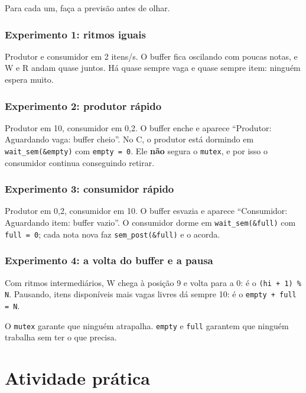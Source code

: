 \documentclass[11pt,a4paper]{article}
\newcommand{\cmd}[1]{\texttt{#1}}
\begin{document}
Para cada um, faça a previsão antes de olhar.

\subsubsection{Experimento 1: ritmos iguais}
Produtor e consumidor em 2 itens/s. O buffer fica oscilando com poucas notas, e W e R andam quase juntos. Há quase sempre vaga e quase sempre item: ninguém espera muito.

\subsubsection{Experimento 2: produtor rápido}
Produtor em 10, consumidor em 0,2. O buffer enche e aparece ``Produtor: Aguardando vaga: buffer cheio''. No C, o produtor está dormindo em \cmd{wait\_sem(\&empty)} com \cmd{empty = 0}. Ele \textbf{não} segura o \cmd{mutex}, e por isso o consumidor continua conseguindo retirar.

\subsubsection{Experimento 3: consumidor rápido}
Produtor em 0,2, consumidor em 10. O buffer esvazia e aparece ``Consumidor: Aguardando item: buffer vazio''. O consumidor dorme em \cmd{wait\_sem(\&full)} com \cmd{full = 0}; cada nota nova faz \cmd{sem\_post(\&full)} e o acorda.

\subsubsection{Experimento 4: a volta do buffer e a pausa}
Com ritmos intermediários, W chega à posição 9 e volta para a 0: é o \cmd{(hi + 1) \% N}. Pausando, itens disponíveis mais vagas livres dá sempre 10: é o \cmd{empty + full = N}.

\begin{exemplo}
O \cmd{mutex} garante que ninguém atrapalha. \cmd{empty} e \cmd{full} garantem que ninguém trabalha sem ter o que precisa.
\end{exemplo}

\section{Atividade prática}
\end{document}
